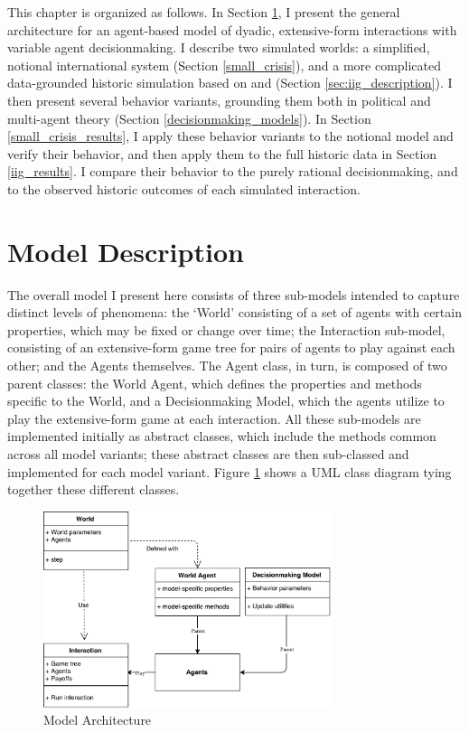 This chapter is organized as follows. In Section \ref{description}, I present the general architecture for an agent-based model of dyadic, extensive-form interactions with variable agent decisionmaking. I describe two simulated worlds: a simplified, notional international system (Section \ref{small_crisis}), and a more complicated data-grounded historic simulation based on \citet{bdm_1992} and \citet{bennett_2000} (Section \ref{sec:iig_description}). I then present several behavior variants, grounding them both in political and multi-agent theory (Section \ref{decisionmaking_models}). In Section \ref{small_crisis_results}, I apply these behavior variants to the notional model and verify their behavior, and then apply them to the full historic data in Section \ref{iig_results}. I compare their behavior to the purely rational decisionmaking, and to the observed historic outcomes of each simulated interaction.

\section{Model Description} \label{description}

The overall model I present here consists of three sub-models intended to capture distinct levels of phenomena: the `World' consisting of a set of agents with certain properties, which may be fixed or change over time; the Interaction sub-model, consisting of an extensive-form game tree for pairs of agents to play against each other; and the Agents themselves. The Agent class, in turn, is composed of two parent classes: the World Agent, which defines the properties and methods specific to the World, and a Decisionmaking Model, which the agents utilize to play the extensive-form game at each interaction. All these sub-models are implemented initially as abstract classes, which include the methods common across all model variants; these abstract classes are then sub-classed and implemented for each model variant. Figure \ref{fig:model_architecture} shows a UML class diagram tying together these different classes.

\begin{figure}[h!]
    \centering
	\includegraphics[width=0.75\textwidth]{WarReason/Figures/ModelArchitecture}
    \caption{Model Architecture}
    \label{fig:model_architecture}
    \figSpace
\end{figure}

